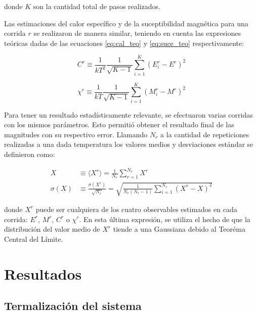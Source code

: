 \documentclass[a4paper,12pt]{article}
\begin{document}
\noindent donde $K$ son la cantidad total de pasos realizados.

Las estimaciones del calor específico y de la suceptibilidad magnética para una 
corrida $r$ se realizaron de manera similar, teniendo en cuenta las expresiones 
teóricas dadas de las ecuaciones \eqref{eq:cal_teo} y \eqref{eq:suce_teo} 
respectivamente:

\begin{equation}
 C^r \equiv  \frac{1}{kT^2} \frac{1}{\sqrt{K-1}} \sum_{i=1}^K \left(
 E_i^r - E^r \right)^2
\end{equation}

\begin{equation}
 \chi^r \equiv  \frac{1}{kT} \frac{1}{\sqrt{K-1}} \sum_{i=1}^K \left(
 M_i^r -  M^r \right)^2
\end{equation}

Para tener un resultado estadísticamente relevante, se efectuaron varias 
corridas con los mismos parámetros. Esto permitió obtener el resultado final de 
las magnitudes con su respectivo error. Llamando $N_r$ a la cantidad de 
repeticiones realizadas a una dada temperatura los valores medios y 
desviaciones estándar se definieron como:

\begin{subequations}
\begin{align}
X & \equiv \langle X^r \rangle = \frac{1}{N_r} 
\sum_{r=1}^{N_r} X^r \\
\sigma(X) & \equiv \frac{\sigma(X^r)}{\sqrt{N_r}} =  \sqrt{\frac{1}{N_r(N_r-1)} 
\sum_{i=1}^{N_r} \left( 
 X^r -  X \right)^2}
\end{align}
\end{subequations}

\noindent donde $X^r$ puede ser cualquiera de los cuatro observables estimados 
en cada corrida: $E^r$, $M^r$, $C^r$ o $\chi^r$. En esta última expresión, se 
utiliza el hecho de que la distribución del valor medio de $X^r$ tiende a una 
Gaussiana debido al Teoréma Central del Límite.



\section{Resultados}

\subsection{Termalización del sistema}
\end{document}
